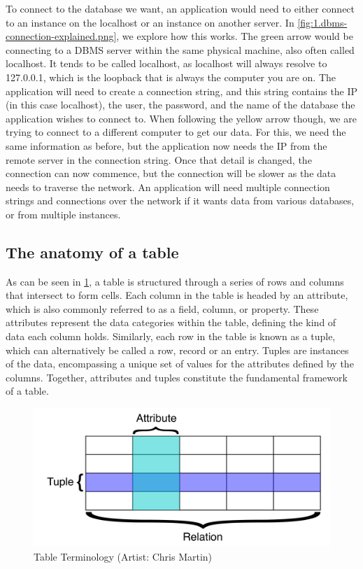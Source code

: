 To connect to the database we want, an application would need to either connect to an instance on the localhost or an instance on another server. In \cref{fig:1.dbms-connection-explained.png}, we explore how this works. The green arrow would be connecting to a DBMS server within the same physical machine, also often called localhost. It tends to be called localhost, as localhost will always resolve to 127.0.0.1, which is the loopback that is always the computer you are on. The application will need to create a connection string, and this string contains the IP (in this case localhost), the user, the password, and the name of the database the application wishes to connect to. When following the yellow arrow though, we are trying to connect to a different computer to get our data. For this, we need the same information as before, but the application now needs the IP from the remote server in the connection string. Once that detail is changed, the connection can now commence, but the connection will be slower as the data needs to traverse the network. An application will need multiple connection strings and connections over the network if it wants data from various databases, or from multiple instances.

\subsection{The anatomy of a table}
As can be seen in \cref{fig:2.table-definitions.png}, a table is structured through a series of rows and columns that intersect to form cells. Each column in the table is headed by an attribute, which is also commonly referred to as a field, column, or property. These attributes represent the data categories within the table, defining the kind of data each column holds. Similarly, each row in the table is known as a tuple, which can alternatively be called a row, record or an entry. Tuples are instances of the data, encompassing a unique set of values for the attributes defined by the columns. Together, attributes and tuples constitute the fundamental framework of a table.

\begin{figure}[htbp]
    \centering
    \includegraphics[width=1\textwidth]{content/1-relational-databases/figures/2.table-definitions.png}
    \caption{Table Terminology (Artist: Chris Martin)}
    \label{fig:2.table-definitions.png}
\end{figure}

